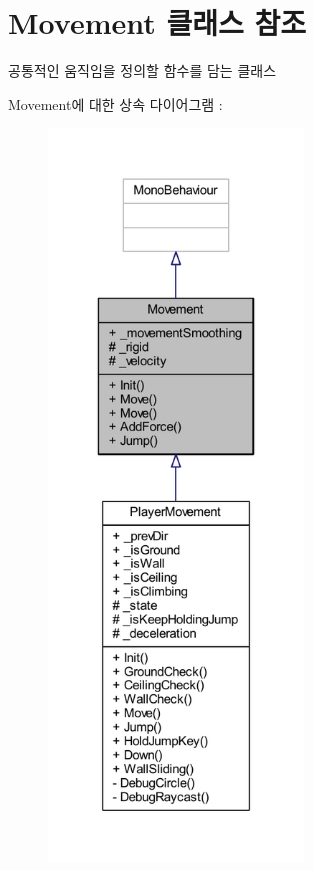 \hypertarget{class_movement}{}\section{Movement 클래스 참조}
\label{class_movement}


공통적인 움직임을 정의할 함수를 담는 클래스  




Movement에 대한 상속 다이어그램 \+: 
\nopagebreak
\begin{figure}[H]
\begin{center}
\leavevmode
\includegraphics[height=550pt]{d8/d54/class_movement__inherit__graph}
\end{center}
\end{figure}


